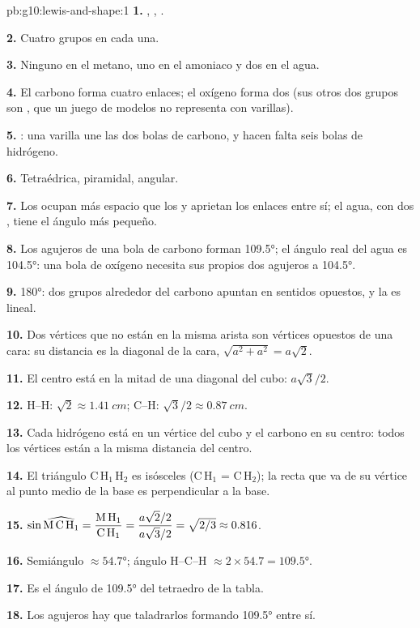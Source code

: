 \begin{solution}{pb:g10:lewis-and-shape:1}
\textbf{1.} , ,
.

\textbf{2.} Cuatro grupos en cada una.

\textbf{3.} Ninguno en el metano, uno en el amoniaco y dos en el agua.

\textbf{4.} El carbono forma cuatro enlaces; el oxígeno forma dos (sus
otros dos grupos son , que un juego de modelos no
representa con varillas).

\textbf{5.} : una varilla une
las dos bolas de carbono, y hacen falta seis bolas de hidrógeno.

\textbf{6.} Tetraédrica, piramidal, angular.

\textbf{7.} Los  ocupan más espacio que los  y aprietan los enlaces entre sí; el agua, con dos , tiene el ángulo más pequeño.

\textbf{8.} Los agujeros de una bola de carbono forman \ang{109.5}; el
ángulo real del agua es \ang{104.5}: una bola de oxígeno necesita sus
propios dos agujeros a \ang{104.5}.

\textbf{9.} \ang{180}: dos grupos alrededor del carbono apuntan en
sentidos opuestos, y la  es lineal.

\textbf{10.} Dos vértices que no están en la misma arista son vértices
opuestos de una cara: su distancia es la diagonal de la cara,
$\sqrt{a^2 + a^2} = a\sqrt{2}$.

\textbf{11.} El centro está en la mitad de una diagonal del cubo:
$a\sqrt{3}/2$.

\textbf{12.} H--H: $\sqrt{2} \approx \qty{1.41}{cm}$; C--H:
$\sqrt{3}/2 \approx \qty{0.87}{cm}$.

\textbf{13.} Cada hidrógeno está en un vértice del cubo y el carbono en
su centro: todos los vértices están a la misma distancia del centro.

\textbf{14.} El triángulo C\,H$_1$\,H$_2$ es isósceles (C\,H$_1$ =
C\,H$_2$); la recta que va de su vértice al punto medio de la base es
perpendicular a la base.

\textbf{15.} $\sin \widehat{\text{M\,C\,H}_1} = \dfrac{\text{M\,H}_1}{\text{C\,H}_1}
= \dfrac{a\sqrt{2}/2}{a\sqrt{3}/2} = \sqrt{2/3} \approx 0.816$.

\textbf{16.} Semiángulo $\approx \ang{54.7}$; ángulo H--C--H $\approx
2 \times 54.7 = \ang{109.5}$.

\textbf{17.} Es el ángulo de \ang{109.5} del tetraedro de la tabla.

\textbf{18.} Los agujeros hay que taladrarlos formando \ang{109.5} entre
sí.
\end{solution}
